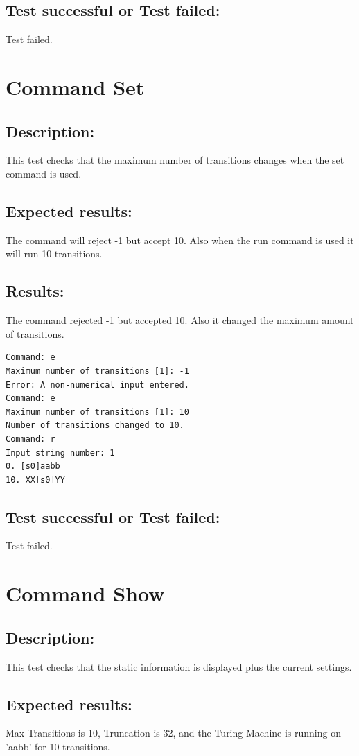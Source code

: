 \documentclass{report}
\begin{document}
\section{Test successful or Test failed:} Test failed.
\pagebreak



\chapter{Command Set}
\section{Description:} This test checks that the maximum number of transitions changes when the set command is used.
\section{Expected results:} The command will reject -1 but accept 10. Also when the run command is used it will run 10 transitions.

\section{Results:} The command rejected -1 but accepted 10. Also it changed the maximum amount of transitions.
\begin{verbatim}
Command: e
Maximum number of transitions [1]: -1
Error: A non-numerical input entered.
Command: e
Maximum number of transitions [1]: 10
Number of transitions changed to 10.
Command: r
Input string number: 1
0. [s0]aabb
10. XX[s0]YY
\end{verbatim}
\section{Test successful or Test failed:} Test failed.
\pagebreak




\chapter{Command Show}
\section{Description:} This test checks that the static information is displayed plus the current settings.
\section{Expected results:} Max Transitions is 10, Truncation is 32, and the Turing Machine is running on 'aabb' for 10 transitions.
\end{document}
